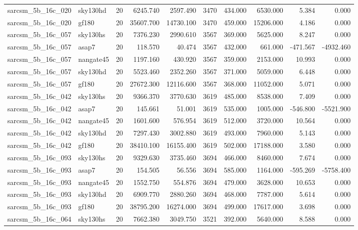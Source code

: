 \begin{longtable}{llrrrrrrrr}
sarcsm\_5b\_16c\_020 & sky130hd & 20 & 6245.740 & 2597.490 & 3470 & 434.000 & 6530.000 & 5.384 & 0.000 \\
sarcsm\_5b\_16c\_020 & gf180 & 20 & 35607.700 & 14730.100 & 3470 & 459.000 & 15206.000 & 4.186 & 0.000 \\
sarcsm\_5b\_16c\_057 & sky130hs & 20 & 7376.230 & 2990.610 & 3567 & 369.000 & 5625.000 & 8.247 & 0.000 \\
sarcsm\_5b\_16c\_057 & asap7 & 20 & 118.570 & 40.474 & 3567 & 432.000 & 661.000 & -471.567 & -4932.460 \\
sarcsm\_5b\_16c\_057 & nangate45 & 20 & 1197.160 & 430.920 & 3567 & 359.000 & 2153.000 & 10.993 & 0.000 \\
sarcsm\_5b\_16c\_057 & sky130hd & 20 & 5523.460 & 2352.260 & 3567 & 371.000 & 5059.000 & 6.448 & 0.000 \\
sarcsm\_5b\_16c\_057 & gf180 & 20 & 27672.300 & 12116.600 & 3567 & 368.000 & 11052.000 & 5.071 & 0.000 \\
sarcsm\_5b\_16c\_042 & sky130hs & 20 & 9366.370 & 3770.630 & 3619 & 485.000 & 8538.000 & 7.409 & 0.000 \\
sarcsm\_5b\_16c\_042 & asap7 & 20 & 145.661 & 51.001 & 3619 & 535.000 & 1005.000 & -546.800 & -5521.900 \\
sarcsm\_5b\_16c\_042 & nangate45 & 20 & 1601.600 & 576.954 & 3619 & 512.000 & 3720.000 & 10.564 & 0.000 \\
sarcsm\_5b\_16c\_042 & sky130hd & 20 & 7297.430 & 3002.880 & 3619 & 493.000 & 7960.000 & 5.143 & 0.000 \\
sarcsm\_5b\_16c\_042 & gf180 & 20 & 38410.100 & 16155.400 & 3619 & 502.000 & 17188.000 & 3.580 & 0.000 \\
sarcsm\_5b\_16c\_093 & sky130hs & 20 & 9329.630 & 3735.460 & 3694 & 466.000 & 8460.000 & 7.674 & 0.000 \\
sarcsm\_5b\_16c\_093 & asap7 & 20 & 154.505 & 56.556 & 3694 & 585.000 & 1164.000 & -595.269 & -5758.400 \\
sarcsm\_5b\_16c\_093 & nangate45 & 20 & 1552.750 & 554.876 & 3694 & 479.000 & 3628.000 & 10.653 & 0.000 \\
sarcsm\_5b\_16c\_093 & sky130hd & 20 & 6909.770 & 2880.260 & 3694 & 468.000 & 7787.000 & 5.614 & 0.000 \\
sarcsm\_5b\_16c\_093 & gf180 & 20 & 38795.200 & 16274.000 & 3694 & 499.000 & 17617.000 & 3.698 & 0.000 \\
sarcsm\_5b\_16c\_064 & sky130hs & 20 & 7662.380 & 3049.750 & 3521 & 392.000 & 5640.000 & 8.588 & 0.000 \\

\end{longtable}
